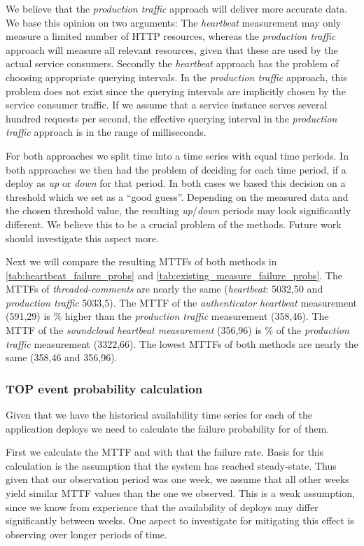 We believe that the \emph{production traffic} approach will deliver more accurate data. We base this opinion on two arguments: The \emph{heartbeat} measurement may only measure a limited number of HTTP resources, whereas the \emph{production traffic} approach will measure all relevant resources, given that these are used by the actual service consumers. Secondly the \emph{heartbeat} approach has the problem of choosing appropriate querying intervals. In the \emph{production traffic} approach, this problem does not exist since the querying intervals are implicitly chosen by the service consumer traffic. If we assume that a service instance serves several hundred requests per second, the effective querying interval in the \emph{production traffic} approach is in the range of milliseconds.

For both approaches we split time into a time series with equal time periods. In both approaches we then had the problem of deciding for each time period, if a deploy as \emph{up} or \emph{down} for that period. In both cases we based this decision on a threshold which we set as a ``good guess''. Depending on the measured data and the chosen threshold value, the resulting \emph{up}/\emph{down} periods may look significantly different. We believe this to be a crucial problem of the methods. Future work should investigate this aspect more.

Next we will compare the resulting MTTFs of both methods in  \autoref{tab:heartbeat_failure_probs} and \autoref{tab:existing_measure_failure_probs}. The MTTFs of \emph{threaded-comments} are nearly the same (\emph{heartbeat}: 5032,50 and \emph{production traffic} 5033,5). The MTTF of the \emph{authenticator} \emph{heartbeat} measurement (591,29) is \% higher than the \emph{production traffic} measurement (358,46). The MTTF of the \emph{soundcloud} \emph{heartbeat measurement} (356,96) is \% of the \emph{production traffic} measurement (3322,66). The lowest MTTFs of both methods are nearly the same (358,46 and 356,96).

\subsubsection{TOP event probability calculation}

Given that we have the historical availability time series for each of the application deploys we need to calculate the failure probability for of them.

First we calculate the MTTF and with that the failure rate. Basis for this calculation is the assumption that the system has reached steady-state. Thus given that our observation period was one week, we assume that all other weeks yield similar MTTF values than the one we observed. This is a weak assumption, since we know from experience that the availability of deploys may differ significantly between weeks. One aspect to investigate for mitigating this effect is observing over longer periods of time.

